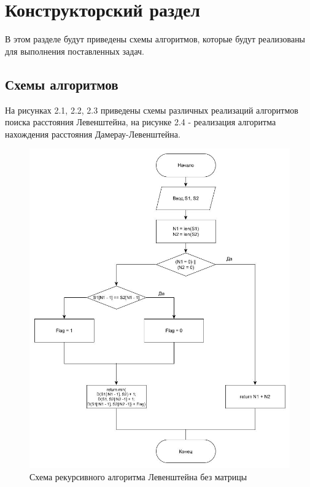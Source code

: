 \chapter{Конструкторский раздел}
В этом разделе будут приведены схемы алгоритмов, которые будут реализованы для выполнения поставленных задач.

\section{Схемы алгоритмов}
На рисунках 2.1, 2.2, 2.3 приведены схемы различных реализаций алгоритмов поиска расстояния Левенштейна, на рисунке 2.4 - реализация алгоритма нахождения расстояния Дамерау-Левенштейна.


\begin{figure}[hp]
    \begin{center}
        \includegraphics[width=\linewidth]{graph/LevenRec.jpg}
    \end{center}
    \caption{Схема рекурсивного алгоритма Левенштейна без матрицы}
\end{figure}

